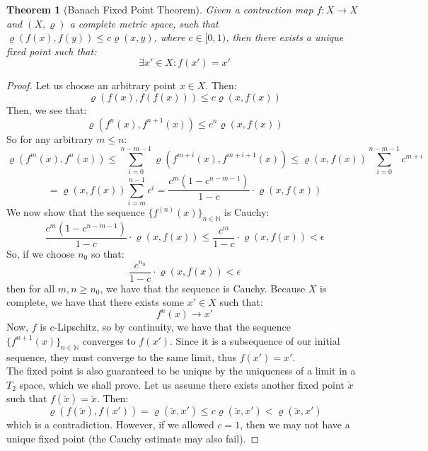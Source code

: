 \documentclass[10pt,letterpaper]{article} %
\newtheorem{thm}{Theorem}[section]
\begin{document}
\begin{thm}[Banach Fixed Point Theorem]
Given a contraction map $f: X \xrightarrow{} X$ and $(X, \varrho)$ a complete metric space, such that $\varrho(f(x), f(y)) \leqslant c \varrho(x, y)$, where $c \in [0, 1)$, then there exists a unique fixed point such that:
\begin{equation*}
\exists x' \in X: f(x') = x'
\end{equation*}
\end{thm}
\begin{proof}
Let us choose an arbitrary point $x \in X$. Then:
\begin{equation*}
\varrho(f(x), f(f(x))) \leqslant c\varrho(x, f(x))
\end{equation*}
Then, we see that:
\begin{equation*}
\varrho(f^n(x), f^{n+1}(x)) \leqslant c^n\varrho(x, f(x))
\end{equation*}
So for any arbitrary $m \leqslant n$:
\begin{equation*}
\varrho(f^m(x), f^{n}(x)) \leqslant \sum_{i=0}^{n-m-1}\varrho(f^{m+i}(x), f^{m+i+1}(x)) \leqslant \varrho(x, f(x))\sum_{i=0}^{n-m-1}c^{m+i}
\end{equation*}
\begin{equation*}
= \varrho(x, f(x))\sum_{i=m}^{n-1}c^i = \frac{c^m(1-c^{n-m-1})}{1-c} \cdot \varrho(x, f(x))
\end{equation*}
We now show that the sequence $\{f^{(n)}(x)\}_{n \in \mathbb{N}}$ is Cauchy:
\begin{equation*}
\frac{c^m(1 - c^{n-m-1})}{1-c}\cdot \varrho(x, f(x)) \leqslant \frac{c^m}{1-c}\cdot \varrho(x, f(x)) < \epsilon
\end{equation*}
So, if we choose $n_0$ so that:
\begin{equation*}
\frac{c^{n_0}}{1-c} \cdot \varrho(x, f(x)) < \epsilon
\end{equation*}
then for all $m, n \geqslant n_0$, we have that the sequence is Cauchy. Because $X$ is complete, we have that there exists some $x' \in X$ such that:
\begin{equation*}
f^{n}(x) \xrightarrow{} x'
\end{equation*}
Now, $f$ is $c$-Lipschitz, so by continuity, we have that the sequence $\{f^{n+1}(x)\}_{n \in \mathbb{N}}$ converges to $f(x')$. Since it is a subsequence of our initial sequence, they must converge to the same limit, thus $f(x') = x'$.\\

The fixed point is also guaranteed to be unique by the uniqueness of a limit in a $T_2$ space, which we shall prove. Let us assume there exists another fixed point $\tilde{x}$ such that $f(\tilde{x}) = \tilde{x}$. Then:
\begin{equation*}
\varrho(f(\tilde{x}), f(x')) = \varrho(\tilde{x}, x') \leqslant c\varrho(\tilde{x}, x') < \varrho(\tilde{x}, x')
\end{equation*} 
which is a contradiction. However, if we allowed $c = 1$, then we may not have a unique fixed point (the Cauchy estimate may also fail).
\end{proof}
\end{document}
